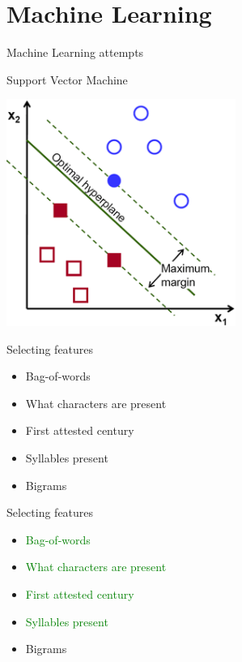 \documentclass[10pt]{beamer}
\begin{document}
\section{Machine Learning}

\begin{frame}[fragile]{Machine Learning attempts}
  
  Support Vector Machine

  \centerline{\includegraphics[width=7.5cm]{svmillustration.png}}

\end{frame}

\begin{frame}[fragile]{Selecting features}
  
  \begin{itemize}[<+->]
    \item Bag-of-words
    \item What characters are present
    \item First attested century
    \item Syllables present
    \item Bigrams
  \end{itemize}

\end{frame}

\begin{frame}[fragile]{Selecting features}
  
  \begin{itemize}
    \item \textcolor{green}{Bag-of-words}
    \item \textcolor{green}{What characters are present}
    \item \textcolor{green}{First attested century}
    \item \textcolor{green}{Syllables present}
    \item Bigrams
  \end{itemize}

\end{frame}
\end{document}
